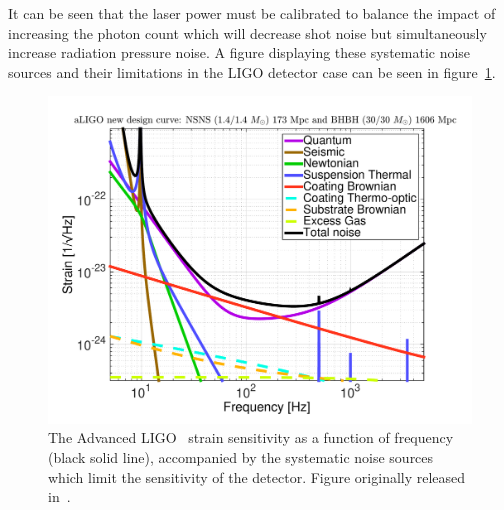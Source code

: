 It can be seen that the laser power must be calibrated to balance the impact of increasing the photon count which will decrease shot noise but simultaneously increase radiation pressure noise. A figure displaying these systematic noise sources and their limitations in the LIGO detector case can be seen in figure~\ref{3:fig:aLIGO_noise}.
%
\begin{figure}
    \centering
    \includegraphics[width=1.0\linewidth]{images/3_detector_characterisation/aLIGO_newDesign.pdf}
    \caption{The Advanced LIGO~\cite{aLIGO:2015} strain sensitivity as a function of frequency (black solid line), accompanied by the systematic noise sources which limit the sensitivity of the detector. Figure originally released in~\cite{aLIGO_design_curve:2018}.}
    \label{3:fig:aLIGO_noise}
\end{figure}
%

